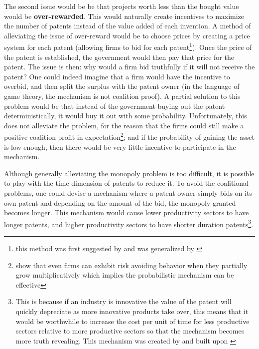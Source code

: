 The second issue would be be that projects worth less than the bought value would be \textbf{over-rewarded}. This would naturally create incentives to maximize the number of patents instead of the value added of each invention. A method of alleviating the issue of over-reward would be to choose prices by creating a price system for each patent (allowing firms to bid for each patent\footnote{this method was first suggested by \cite{kremer_1998} and was generalized by \cite{weyl2012market}}). Once the price of the patent is established, the government would then pay that price for the patent. The issue is then: why would a firm bid truthfully if it will not receive the patent? One could indeed imagine that a firm would have the incentive to overbid, and then split the surplus with the patent owner (in the language of game theory, the mechanism is not coalition proof). A partial solution to this problem would be that instead of the government buying out the patent deterministically, it would buy it out with some probability. Unfortunately, this does not alleviate the problem, for the reason that the firms could still make a positive coalition profit in expectation\footnote{\cite{PetersAdamou2018a} show that even firms can exhibit risk avoiding behavior when they partially grow multiplicatively which implies the probabilistic mechanism can be effective}; and if the probability of gaining the asset is low enough, then there would be very little incentive to participate in the mechanism. 

Although generally alleviating the monopoly problem is too difficult, it is possible to play with the time dimension of patents to reduce it. To avoid the coalitional problems, one could devise a mechanism where a patent owner simply bids on its own patent and depending on the amount of the bid, the monopoly granted becomes longer. This mechanism would cause lower productivity sectors to have longer patents, and higher productivity sectors to have shorter duration patents\footnote{ This is because if an industry is innovative the value of the patent will quickly depreciate as more innovative products take over, this means that it would be worthwhile to increase the cost per unit of time for less productive sectors relative to more productive sectors so that the mechanism becomes more truth revealing. This mechanism was created by \cite{Scotchmer1999} and built upon \cite{Cornelli1999}}.

